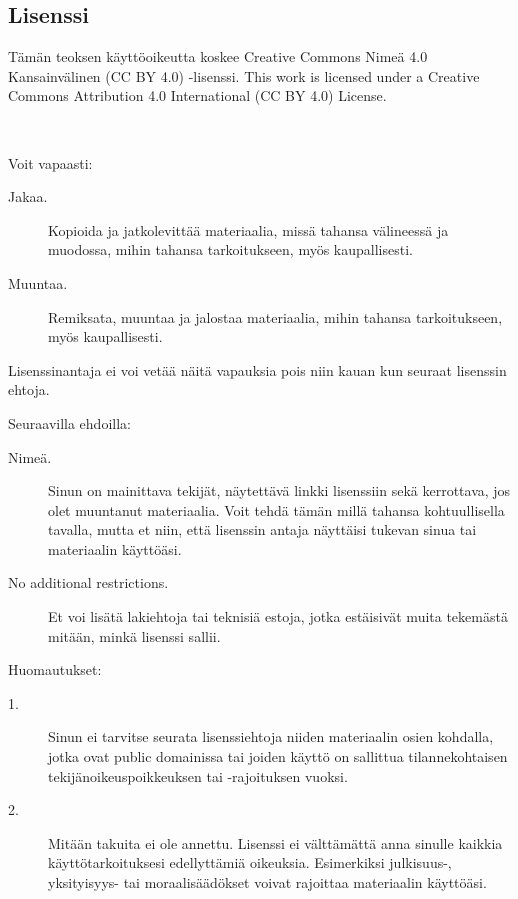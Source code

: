 \subsection*{Lisenssi}

Tämän teoksen käyttöoikeutta koskee Creative Commons Nimeä 4.0 Kansainvälinen (CC BY 4.0) -lisenssi.
This work is licensed under a Creative Commons Attribution 4.0 International (CC BY 4.0) License.

 \\

Voit vapaasti:
\begin{description}
\item[Jakaa.] Kopioida ja jatkolevittää materiaalia, missä tahansa välineessä ja muodossa, mihin tahansa tarkoitukseen, myös kaupallisesti.
\item[Muuntaa.] Remiksata, muuntaa ja jalostaa materiaalia, mihin tahansa tarkoitukseen, myös kaupallisesti.
\end{description}

Lisenssinantaja ei voi vetää näitä vapauksia pois niin kauan kun seuraat lisenssin ehtoja.

Seuraavilla ehdoilla:
\begin{description}
\item[Nimeä.] Sinun on mainittava tekijät, näytettävä linkki lisenssiin sekä kerrottava, jos olet muuntanut materiaalia. Voit tehdä tämän millä tahansa kohtuullisella tavalla, mutta et niin, että lisenssin antaja näyttäisi tukevan sinua tai materiaalin käyttöäsi.
\item[No additional restrictions.] Et voi lisätä lakiehtoja tai teknisiä estoja, jotka estäisivät muita tekemästä mitään, minkä lisenssi sallii.
\end{description}

Huomautukset:
\begin{description}
\item[1.] Sinun ei tarvitse seurata lisenssiehtoja niiden materiaalin osien kohdalla, jotka ovat public domainissa tai joiden käyttö on
sallittua tilannekohtaisen tekijänoikeuspoikkeuksen tai -rajoituksen vuoksi.
\item[2.] Mitään takuita ei ole annettu. Lisenssi ei välttämättä anna sinulle kaikkia käyttötarkoituksesi edellyttämiä oikeuksia. Esimerkiksi julkisuus-, yksityisyys- tai moraalisäädökset voivat rajoittaa materiaalin käyttöäsi.
\end{description}
